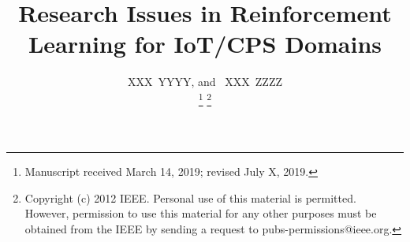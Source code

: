 \documentclass[journal]{IEEEtran}
\begin{document}
%
\title{Research Issues in Reinforcement Learning for IoT/CPS Domains}
%
%
%

\author{XXX~YYYY,
        and~ XXX~ZZZZ%

\thanks{Manuscript received March 14, 2019; revised July X, 2019.}
\thanks{Copyright (c) 2012 IEEE. Personal use of this material is permitted. However, permission to use this material for any other purposes must be obtained from the IEEE by sending a request to pubs-permissions@ieee.org.}
}

%
%
\end{document}
